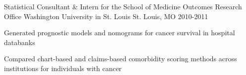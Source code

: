 \begin{cventries}
\cventry
{Statistical Consultant \& Intern for the School of Medicine Outcomes Research Office} %
{Washington University in St. Louis} %
{St. Louis, MO} %
{2010-2011} %
{
	\begin{cvitems} %
		\item {Generated prognostic models and nomograms for cancer survival in hospital databanks}
		\item {Compared chart-based and claims-based comorbidity scoring methods across institutions for individuals with cancer}
	\end{cvitems}
}



\end{cventries}
